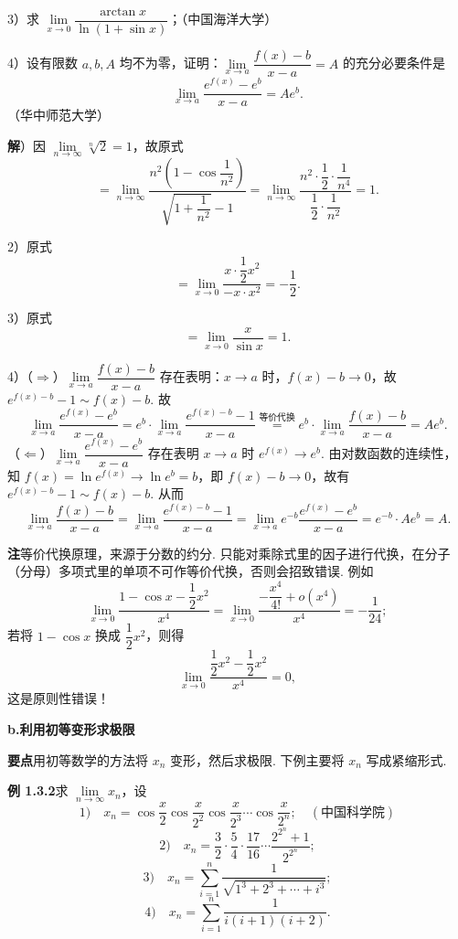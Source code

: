\documentclass[UTF8,12pt,a4paper,fontset=fandol]{ctexart}
\begin{document}
3）求 $\lim\limits_{x\to0}\dfrac{\arctan x}{\ln(1+\sin x)}$；（中国海洋大学）

4）设有限数 $a,b,A$ 均不为零，证明：$\lim\limits_{x\to a}\dfrac{f(x)-b}{x-a}=A$ 的充分必要条件是
\[
  \lim_{x\to a}\frac{e^{f(x)}-e^b}{x-a}=Ae^b.
\]
（华中师范大学）

\noindent\textbf{解}）因 $\lim\limits_{n\to\infty}\sqrt[n]{2}=1$，故原式
\[
=\lim_{n\to\infty}
\frac{n^2\left(1-\cos\dfrac1{n^2}\right)}
{\sqrt{1+\dfrac1{n^2}}-1}
=\lim_{n\to\infty}
\frac{n^2\cdot\dfrac12\cdot\dfrac1{n^4}}
{\dfrac12\cdot\dfrac1{n^2}}=1.
\]

2）原式
\[
=\lim_{x\to0}\frac{x\cdot\dfrac12x^2}{-x\cdot x^2}=-\frac12.
\]

3）原式
\[
=\lim_{x\to0}\frac{x}{\sin x}=1.
\]

4）（$\Rightarrow$）$\lim\limits_{x\to a}\dfrac{f(x)-b}{x-a}$ 存在表明：$x\to a$ 时，$f(x)-b\to0$，故 $e^{f(x)-b}-1\sim f(x)-b$. 故
\[
\lim_{x\to a}\frac{e^{f(x)}-e^b}{x-a}
=e^b\cdot\lim_{x\to a}\frac{e^{f(x)-b}-1}{x-a}
\stackrel{\text{等价代换}}{=}e^b\cdot\lim_{x\to a}\frac{f(x)-b}{x-a}=Ae^b.
\]
（$\Leftarrow$）$\lim\limits_{x\to a}\dfrac{e^{f(x)}-e^b}{x-a}$ 存在表明 $x\to a$ 时 $e^{f(x)}\to e^b$. 由对数函数的连续性，知 $f(x)=\ln e^{f(x)}\to\ln e^b=b$，即 $f(x)-b\to0$，故有 $e^{f(x)-b}-1\sim f(x)-b$. 从而
\[
\lim_{x\to a}\frac{f(x)-b}{x-a}
=\lim_{x\to a}\frac{e^{f(x)-b}-1}{x-a}
=\lim_{x\to a}e^{-b}\frac{e^{f(x)}-e^b}{x-a}
=e^{-b}\cdot Ae^b=A.
\]

\noindent\textbf{注}\quad 等价代换原理，来源于分数的约分. 只能对乘除式里的因子进行代换，在分子（分母）多项式里的单项不可作等价代换，否则会招致错误. 例如
\[
  \lim_{x\to0}\frac{1-\cos x-\dfrac12x^2}{x^4}
  =
  \lim_{x\to0}\frac{-\dfrac{x^4}{4!}+o(x^4)}{x^4}
  =-\frac1{24};
\]
若将 $1-\cos x$ 换成 $\dfrac12x^2$，则得
\[
  \lim_{x\to0}\frac{\dfrac12x^2-\dfrac12x^2}{x^4}=0,
\]
这是原则性错误！

\noindent\textbf{b.\quad 利用初等变形求极限}

\noindent\textbf{要点}\quad 用初等数学的方法将 $x_n$ 变形，然后求极限. 下例主要将 $x_n$ 写成紧缩形式.

\noindent\textbf{例 1.3.2}\quad 求 $\lim\limits_{n\to\infty}x_n$，设
\[
1)\quad x_n=\cos\frac{x}{2}\cos\frac{x}{2^2}\cos\frac{x}{2^3}\cdots\cos\frac{x}{2^n};\quad(\text{中国科学院})
\]
\[
2)\quad x_n=\frac32\cdot\frac54\cdot\frac{17}{16}\cdots\frac{2^{2^n}+1}{2^{2^n}};
\]
\[
3)\quad x_n=\sum_{i=1}^n\frac1{\sqrt{1^3+2^3+\cdots+i^3}};
\]
\[
4)\quad x_n=\sum_{i=1}^n\frac1{i(i+1)(i+2)}.
\]
\end{document}
